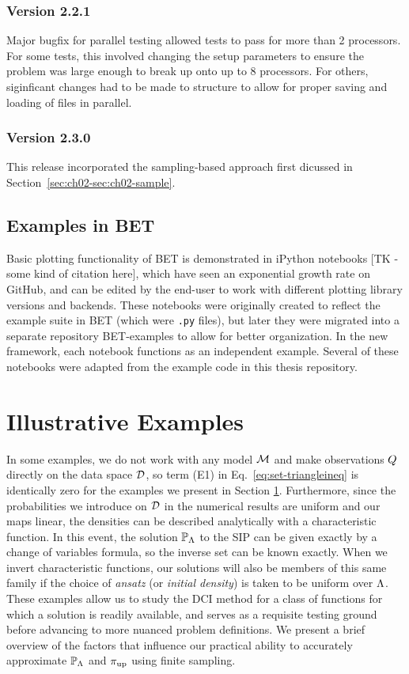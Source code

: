 \subsubsection{Version 2.2.1}
Major bugfix for parallel testing allowed tests to pass for more than 2 processors.
For some tests, this involved changing the setup parameters to ensure the problem was large enough to break up onto up to 8 processors.
For others, siginficant changes had to be made to structure to allow for proper saving and loading of files in parallel.


\subsubsection{Version 2.3.0}
This release incorporated the sampling-based approach first dicussed in Section~\ref{sec:ch02-sec:ch02-sample}.


\subsection{Examples in BET}
Basic plotting functionality of BET is demonstrated in iPython notebooks [TK - some kind of citation here], which have seen an exponential growth rate on GitHub, and can be edited by the end-user to work with different plotting library versions and backends.
These notebooks were originally created to reflect the example suite in BET (which were {\tt .py} files), but later they were migrated into a separate repository BET-examples to allow for better organization.
In the new framework, each notebook functions as an independent example.
Several of these notebooks were adapted from the example code in this thesis repository.


\section{Illustrative Examples}\label{sec:ch02-examples}
In some examples, we do not work with any model $\mathcal{M}$ and make observations $Q$ directly on the data space $\mathcal{D}$, so term (E1) in Eq.~\eqref{eq:set-triangleineq} is identically zero for the examples we present in Section \ref{sec:ch02-examples}.
Furthermore, since the probabilities we introduce on $\mathcal{D}$ in the numerical results are uniform and our maps linear, the densities can be described analytically with a characteristic function.
In this event, the solution $\operatorname*{\mathbb{P}_{{\Lambda}}}$ to the SIP can be given exactly by a change of variables formula, so the inverse set can be known exactly.
When we invert characteristic functions, our solutions will also be members of this same family if the choice of \emph{ansatz} (or \emph{initial density}) is taken to be uniform over ${\Lambda}$.
These examples allow us to study the DCI method for a class of functions for which a solution is readily available, and serves as a requisite testing ground before advancing to more nuanced problem definitions.
We present a brief overview of the factors that influence our practical ability to accurately approximate $\operatorname*{\mathbb{P}_{{\Lambda}}}$ and $\operatorname*{\pi_{up}}$ using finite sampling.

